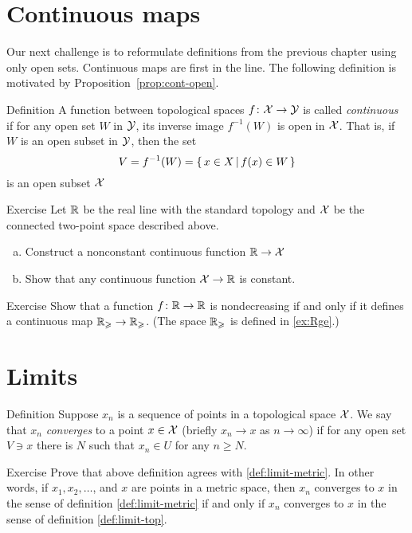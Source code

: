 \section{Continuous maps}

Our next challenge is to reformulate definitions from the previous chapter using only open sets.
Continuous maps are first in the line.
The following definition is motivated by Proposition~\ref{prop:cont-open}.

\begin{thm}{Definition}\label{def:cont-top}
A function between topological spaces 
$f\colon\mathcal{X}\to\mathcal{Y}$ is called \emph{continuous} if for any open set $W$ in $\mathcal{Y}$, its inverse image $f^{-1}(W)$ is open in $\mathcal{X}$.
That is, if $W$ is an open subset in $\mathcal{Y}$, then the set
\[V=f^{-1}(W)=\left\{\,{x\in X}\,\middle|\,{f(x)\in W}\,\right\}\]
is an open subset $\mathcal{X}$
\end{thm}

\begin{thm}{Exercise}
Let $\mathbb{R}$ be the real line with the standard topology
and $\mathcal{X}$ be the connected two-point space described above.
\begin{enumerate}[(a)]
\item Construct a nonconstant continuous function $\mathbb{R}\to \mathcal{X}$
\item Show that any continuous function $\mathcal{X}\to \mathbb{R}$ is constant.
\end{enumerate}

\end{thm}

\begin{thm}{Exercise} 
Show that a function $f\colon\mathbb{R}\to\mathbb{R}$ is nondecreasing if and only if it defines a continuous map $\mathbb{R}_\geqslant\to \mathbb{R}_\geqslant$.
(The space $\mathbb{R}_\geqslant$ is defined in \ref{ex:Rge}.)
\end{thm}

\section{Limits}

\begin{thm}{Definition}\label{def:limit-top}
Suppose $x_n$ is a sequence of points in a topological space $\mathcal{X}$.
We say that $x_n$ \emph{converges} to a point $x\in \mathcal{X}$ (briefly $x_n\to x$ as $n\to\infty$) if for any open set $V\ni x$ there is $N$ such that 
$x_n\in U$ for any $n\ge N$.
\end{thm}

\begin{thm}{Exercise}
Prove that above definition agrees with \ref{def:limit-metric}.
In other words, if $x_1,x_2,\dots$, and $x$ are points in a metric space, then $x_n$ converges to $x$ in the sense of definition \ref{def:limit-metric} if and only if $x_n$ converges to $x$ in the sense of definition \ref{def:limit-top}.
\end{thm}

